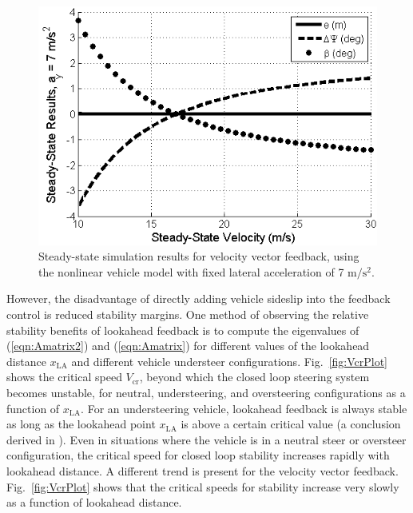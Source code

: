 \documentclass[10pt,a4paper]{article}
\begin{document}
\begin{figure}[h]
\centering
\includegraphics[width=\columnwidth]{figures/LinearErrorPlotBeta.png}
\caption{Steady-state simulation results for velocity vector feedback, using the nonlinear vehicle model with fixed lateral acceleration of 7 $\mathrm{m/s^2}$.}
\label{fig:linError2}
\end{figure}

However, the disadvantage of directly adding vehicle sideslip 
into the feedback control is reduced stability margins. One method of observing the relative stability benefits of lookahead feedback is to compute the eigenvalues of (\ref{eqn:Amatrix2}) and (\ref{eqn:Amatrix}) for different
values of the lookahead distance $x_\mathrm{LA}$ and different vehicle understeer configurations. Fig.~\ref{fig:VcrPlot} shows the critical speed $V_\mathrm{cr}$, beyond which the closed loop steering system
becomes unstable, for neutral, understeering, and oversteering configurations as a function of $x_\mathrm{LA}$. For an understeering vehicle, lookahead feedback is always stable as long
as the lookahead point $x_\mathrm{LA}$ is above a certain critical value (a conclusion derived in \cite{rossetter2002}). Even in situations where the vehicle is in a 
neutral steer or oversteer configuration, the critical speed for closed loop stability increases rapidly with lookahead distance. A different trend is present for the velocity vector
feedback. Fig.~\ref{fig:VcrPlot} shows that the critical speeds for stability increase very slowly as a function of lookahead distance.  
\end{document}
